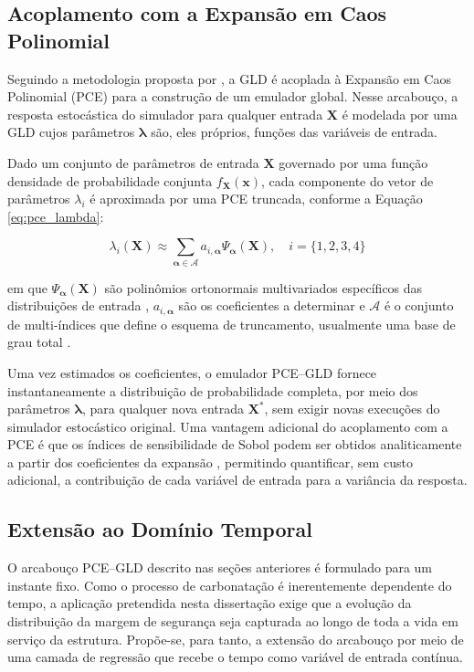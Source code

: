 \subsection{Acoplamento com a Expansão em Caos Polinomial}

Seguindo a metodologia proposta por \textcite{ZhuSudret2021}, a GLD é acoplada à Expansão em Caos Polinomial (PCE) para a construção de um emulador global. Nesse arcabouço, a resposta estocástica do simulador para qualquer entrada $\mathbf{X}$ é modelada por uma GLD cujos parâmetros $\boldsymbol{\lambda}$ são, eles próprios, funções das variáveis de entrada.

Dado um conjunto de parâmetros de entrada $\mathbf{X}$ governado por uma função densidade de probabilidade conjunta $f_{\mathbf{X}}(\mathbf{x})$, cada componente do vetor de parâmetros $\lambda_i$ é aproximada por uma PCE truncada, conforme a Equação \eqref{eq:pce_lambda}:

\begin{equation}\label{eq:pce_lambda}
\lambda_i(\mathbf{X}) \approx \sum_{\boldsymbol{\alpha} \in \mathcal{A}} a_{i, \boldsymbol{\alpha}} \Psi_{\boldsymbol{\alpha}}(\mathbf{X}), \quad i = \{1, 2, 3, 4\}
\end{equation}

em que $\Psi_{\boldsymbol{\alpha}}(\mathbf{X})$ são polinômios ortonormais multivariados específicos das distribuições de entrada \cite{xiu2002}, $a_{i, \boldsymbol{\alpha}}$ são os coeficientes a determinar e $\mathcal{A}$ é o conjunto de multi-índices que define o esquema de truncamento, usualmente uma base de grau total \cite{blatman2011}.

Uma vez estimados os coeficientes, o emulador PCE--GLD fornece instantaneamente a distribuição de probabilidade completa, por meio dos parâmetros $\boldsymbol{\lambda}$, para qualquer nova entrada $\mathbf{X}^*$, sem exigir novas execuções do simulador estocástico original. Uma vantagem adicional do acoplamento com a PCE é que os índices de sensibilidade de Sobol podem ser obtidos analiticamente a partir dos coeficientes da expansão \cite{sudret2008}, permitindo quantificar, sem custo adicional, a contribuição de cada variável de entrada para a variância da resposta.

\subsection{Extensão ao Domínio Temporal}

O arcabouço PCE--GLD descrito nas seções anteriores é formulado para um instante fixo. Como o processo de carbonatação é inerentemente dependente do tempo, a aplicação pretendida nesta dissertação exige que a evolução da distribuição da margem de segurança seja capturada ao longo de toda a vida em serviço da estrutura. Propõe-se, para tanto, a extensão do arcabouço por meio de uma camada de regressão que recebe o tempo como variável de entrada contínua.

